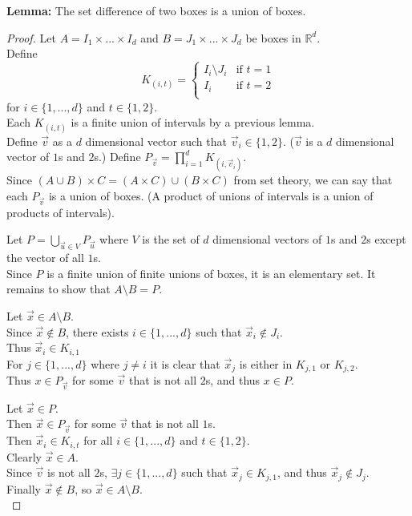 \documentclass[12pt]{article}
\begin{document}
\textbf{Lemma:} The set difference of two boxes is a union of boxes.

\begin{proof}
	Let $A = I_{1} \times ... \times I_{d}$ and $B = J_{1} \times ... \times J_{d}$ be boxes in $\mathds{R}^{d}$. \\
	Define 
	\[ 
		K_{(i,t)} =
		\begin{cases} 
			I_{i} \setminus J_{i} & \text{if } t=1 \\
			I_{i} & \text{if } t=2 \\
		\end{cases}
	\]
	for $i \in \{1,...,d\}$ and $t \in \{1,2\}$.\\
	Each $K_{(i,t)}$ is a finite union of intervals by a previous lemma.\\
	Define $\vec{v}$ as a $d$ dimensional vector such that $\vec{v}_{i} \in \{1,2\}$. ($\vec{v}$ is a $d$ dimensional vector of $1$s and $2$s.)
	Define $P_{\vec{v}} = \prod\limits_{i=1}^{d} K_{(i,\vec{v}_{i})}$. \\
	Since $(A \cup B) \times C = (A \times C) \cup (B \times C)$ from set theory, we can say that each $P_{\vec{v}}$ is a union of boxes. (A product of unions of intervals is a union of products of intervals). \bigbreak
	
	Let $P = \bigcup\limits_{\vec{u} \in V} P_{\vec{u}}$ where $V$ is the set of $d$ dimensional vectors of $1$s and $2$s except the vector of all $1$s. \\
	Since $P$ is a finite union of finite unions of boxes, it is an elementary set. It remains to show that $A \setminus B = P$. \bigbreak
	
	Let $\vec{x} \in A \setminus B$. \\
	Since $\vec{x} \notin B$, there exists $i \in \{1,...,d\}$ such that $\vec{x}_{i} \notin J_{i}$. \\
	Thus $\vec{x}_{i} \in K_{i,1}$ \\
	For $j \in \{1,...,d\}$ where $j \neq i$ it is clear that $\vec{x}_{j}$ is either in $ K_{j,1}$ or $ K_{j,2}$. \\
	Thus $x \in P_{\vec{v}}$ for some $\vec{v}$ that is not all $2$s, and thus $x \in P$. \bigbreak 
	
	Let $\vec{x} \in P$. \\
	Then $\vec{x} \in P_{\vec{v}}$ for some $\vec{v}$ that is not all $1$s. \\
	Then $\vec{x}_{i} \in K_{i,t}$ for all $i \in \{1,...,d\}$ and $t \in \{1,2\}$. \\
	Clearly $\vec{x} \in A$. \\
	Since $\vec{v}$ is not all $2$s, $\exists j \in \{1,...,d\}$ such that $\vec{x}_{j} \in K_{j,1}$, and thus $\vec{x}_{j} \notin J_{j}$. \\
	Finally $\vec{x} \notin B$, so $\vec{x} \in A \setminus B$.	\\
\end{proof}
\end{document}
